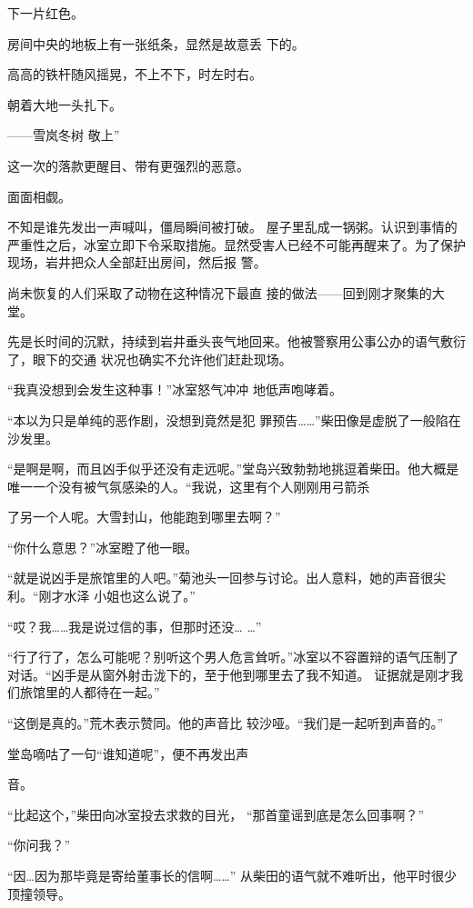 \documentclass{article}
\begin{document}
\newpage
下一片红色。 

房间中央的地板上有一张纸条，显然是故意丢
下的。 


高高的铁杆随风摇晃，不上不下，时左时右。







朝着大地一头扎下。 


——雪岚冬树 敬上” 


这一次的落款更醒目、带有更强烈的恶意。 


面面相觑。 

不知是谁先发出一声喊叫，僵局瞬间被打破。
\newpage
屋子里乱成一锅粥。认识到事情的严重性之后，冰室立即下令采取措施。显然受害人已经不可能再醒来了。为了保护现场，岩井把众人全部赶出房间，然后报
警。 

尚未恢复的人们采取了动物在这种情况下最直
接的做法——回到刚才聚集的大堂。 

先是长时间的沉默，持续到岩井垂头丧气地回来。他被警察用公事公办的语气敷衍了，眼下的交通
状况也确实不允许他们赶赴现场。 

“我真没想到会发生这种事！”冰室怒气冲冲
地低声咆哮着。 

“本以为只是单纯的恶作剧，没想到竟然是犯
罪预告……”柴田像是虚脱了一般陷在沙发里。 

“是啊是啊，而且凶手似乎还没有走远呢。”堂岛兴致勃勃地挑逗着柴田。他大概是唯一一个没有被气氛感染的人。“我说，这里有个人刚刚用弓箭杀
\newpage

了另一个人呢。大雪封山，他能跑到哪里去啊？” 


“你什么意思？”冰室瞪了他一眼。 

“就是说凶手是旅馆里的人吧。”菊池头一回参与讨论。出人意料，她的声音很尖利。“刚才水泽
小姐也这么说了。” 

“哎？我……我是说过信的事，但那时还没…
…” 

“行了行了，怎么可能呢？别听这个男人危言耸听。”冰室以不容置辩的语气压制了对话。“凶手是从窗外射击泷下的，至于他到哪里去了我不知道。
证据就是刚才我们旅馆里的人都待在一起。” 

“这倒是真的。”荒木表示赞同。他的声音比
较沙哑。“我们是一起听到声音的。” 

堂岛嘀咕了一句“谁知道呢”，便不再发出声

\newpage
音。 

“比起这个，”柴田向冰室投去求救的目光，
“那首童谣到底是怎么回事啊？” 


“你问我？” 

“因…因为那毕竟是寄给董事长的信啊……”
从柴田的语气就不难听出，他平时很少顶撞领导。 
\end{document}

